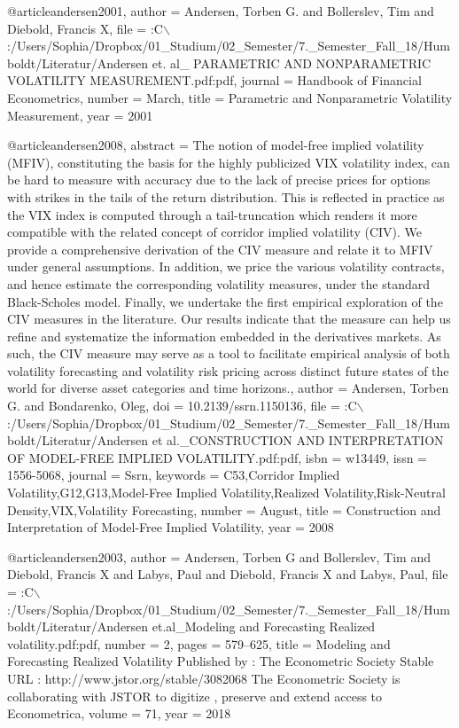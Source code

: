 
@article{andersen2001,
author = {Andersen, Torben G. and Bollerslev, Tim and Diebold, Francis X},
file = {:C$\backslash$:/Users/Sophia/Dropbox/01{\_}Studium/02{\_}Semester/7.{\_}Semester{\_}Fall{\_}18/Humboldt/Literatur/Andersen et. al{\_} PARAMETRIC AND NONPARAMETRIC VOLATILITY MEASUREMENT.pdf:pdf},
journal = {Handbook of Financial Econometrics},
number = {March},
title = {{Parametric and Nonparametric Volatility Measurement}},
year = {2001}
}

@article{andersen2008,
abstract = {The notion of model-free implied volatility (MFIV), constituting the basis for the highly publicized VIX volatility index, can be hard to measure with accuracy due to the lack of precise prices for options with strikes in the tails of the return distribution. This is reflected in practice as the VIX index is computed through a tail-truncation which renders it more compatible with the related concept of corridor implied volatility (CIV). We provide a comprehensive derivation of the CIV measure and relate it to MFIV under general assumptions. In addition, we price the various volatility contracts, and hence estimate the corresponding volatility measures, under the standard Black-Scholes model. Finally, we undertake the first empirical exploration of the CIV measures in the literature. Our results indicate that the measure can help us refine and systematize the information embedded in the derivatives markets. As such, the CIV measure may serve as a tool to facilitate empirical analysis of both volatility forecasting and volatility risk pricing across distinct future states of the world for diverse asset categories and time horizons.},
author = {Andersen, Torben G. and Bondarenko, Oleg},
doi = {10.2139/ssrn.1150136},
file = {:C$\backslash$:/Users/Sophia/Dropbox/01{\_}Studium/02{\_}Semester/7.{\_}Semester{\_}Fall{\_}18/Humboldt/Literatur/Andersen et al.{\_}CONSTRUCTION AND INTERPRETATION OF MODEL-FREE IMPLIED VOLATILITY.pdf:pdf},
isbn = {w13449},
issn = {1556-5068},
journal = {Ssrn},
keywords = {C53,Corridor Implied Volatility,G12,G13,Model-Free Implied Volatility,Realized Volatility,Risk-Neutral Density,VIX,Volatility Forecasting},
number = {August},
title = {{Construction and Interpretation of Model-Free Implied Volatility}},
year = {2008}
}

@article{andersen2003,
author = {Andersen, Torben G and Bollerslev, Tim and Diebold, Francis X and Labys, Paul and Diebold, Francis X and Labys, Paul},
file = {:C$\backslash$:/Users/Sophia/Dropbox/01{\_}Studium/02{\_}Semester/7.{\_}Semester{\_}Fall{\_}18/Humboldt/Literatur/Andersen et.al{\_}Modeling and Forecasting Realized volatility.pdf:pdf},
number = {2},
pages = {579--625},
title = {{Modeling and Forecasting Realized Volatility Published by : The Econometric Society Stable URL : http://www.jstor.org/stable/3082068 The Econometric Society is collaborating with JSTOR to digitize , preserve and extend access to Econometrica}},
volume = {71},
year = {2018}
}

